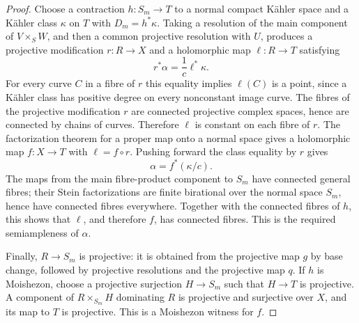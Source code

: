 \begin{proof}
Choose a contraction $h:S_m\to T$ to a normal compact K\"ahler space
and a K\"ahler class $\kappa$ on $T$ with $D_m=h^*\kappa$. Taking a
resolution of the main component of $V\times_S W$, and then a common
projective resolution with $U$, produces a projective modification
$r:R\to X$ and a holomorphic map $\ell:R\to T$ satisfying
\[
                         r^*\alpha=\frac1c\ell^*\kappa.
\]
For every curve $C$ in a fibre of $r$ this equality implies
$\ell(C)$ is a point, since a K\"ahler class has positive degree on
every nonconstant image curve. The fibres of the projective modification
$r$ are connected projective complex spaces, hence are connected by
chains of curves. Therefore $\ell$ is
constant on each fibre of $r$. The factorization theorem for a proper
map onto a normal space gives a holomorphic map $f:X\to T$ with
$\ell=f\circ r$. Pushing forward the class equality by $r$ gives
\[
                              \alpha=f^*(\kappa/c).
\]
The maps from the main fibre-product component to $S_m$ have connected
general fibres; their Stein factorizations are finite birational over
the normal space $S_m$, hence have connected fibres everywhere.
Together with the connected fibres of $h$, this shows that $\ell$,
and therefore $f$, has connected fibres. This is the required
semiampleness of $\alpha$.

Finally, $R\to S_m$ is projective: it is obtained from the projective
map $g$ by base change, followed by projective resolutions and the
projective map $q$. If $h$ is Moishezon, choose a projective surjection
$H\to S_m$ such that $H\to T$ is projective. A component of
$R\times_{S_m}H$ dominating $R$ is projective and surjective over $X$,
and its map to $T$ is projective. This is a Moishezon witness for $f$.
\end{proof}


